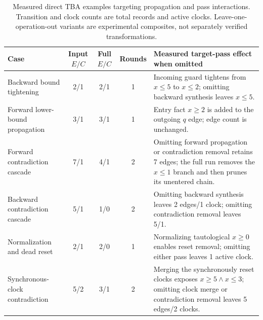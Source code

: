 \begin{table}[t]
\centering
\caption{Measured direct TBA examples targeting propagation and pass interactions. Transition and clock counts are total records and active clocks. Leave-one-operation-out variants are experimental composites, not separately verified transformations.}
\label{tab:synthetic-interactions}
\scriptsize
\setlength{\tabcolsep}{3pt}
\begin{tabular}{@{}p{}cccp{}@{}}
\toprule
Case & Input $E/C$ & Full $E/C$ & Rounds & Measured target-pass effect when omitted\\
\midrule
Backward bound tightening & 2/1 & 2/1 & 1 & Incoming guard tightens from $x\leq5$ to $x\leq2$; omitting backward synthesis leaves $x\leq5$.\\
Forward lower-bound propagation & 3/1 & 3/1 & 1 & Entry fact $x\geq2$ is added to the outgoing $q$ edge; edge count is unchanged.\\
Forward contradiction cascade & 7/1 & 4/1 & 2 & Omitting forward propagation or contradiction removal retains 7 edges; the full run removes the $x\leq1$ branch and then prunes its unentered chain.\\
Backward contradiction cascade & 5/1 & 1/0 & 2 & Omitting backward synthesis leaves 2 edges/1 clock; omitting contradiction removal leaves 5/1.\\
Normalization and dead reset & 2/1 & 2/0 & 1 & Normalizing tautological $x\geq0$ enables reset removal; omitting either pass leaves 1 active clock.\\
Synchronous-clock contradiction & 5/2 & 3/1 & 2 & Merging the synchronously reset clocks exposes $x\geq5\land x\leq3$; omitting clock merge or contradiction removal leaves 5 edges/2 clocks.\\
\bottomrule
\end{tabular}
\end{table}
